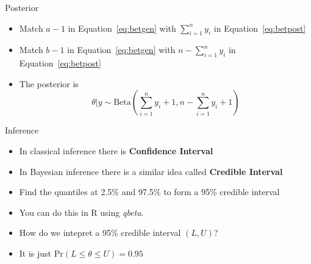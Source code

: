 \documentclass[10pt]{beamer}
\begin{document}
\begin{frame}{Posterior}
  \begin{itemize}
  \item Match $a-1$ in Equation~\ref{eq:betgen} with $\sum\limits_{i=1}^ny_i$ in Equation~\ref{eq:betpost}

  \item Match $b-1$ in Equation~\ref{eq:betgen} with $n-\sum\limits_{i=1}^ny_i$ in Equation~\ref{eq:betpost}

  \item The posterior is
    \begin{equation}
      \theta|y\sim\mbox{Beta}\left(\sum\limits_{i=1}^ny_i+1,n-\sum\limits_{i=1}^ny_i+1\right)
    \end{equation}
  \end{itemize}
\end{frame}
\begin{frame}{Inference}
  \begin{itemize}
  \item In classical inference there is {\bf Confidence Interval}

  \item In Bayesian inference there is a similar idea called {\bf Credible Interval}

  \item Find the quantiles at 2.5\% and 97.5\% to form a 95\% credible interval

  \item You can do this in R using {\em qbeta}.

  \item How do we intepret a 95\% credible interval $(L,U)$?

  \item It is just $\mbox{Pr}\left(L\leq\theta\leq U\right)=0.95$
  \end{itemize}
\end{frame}
\end{document}
